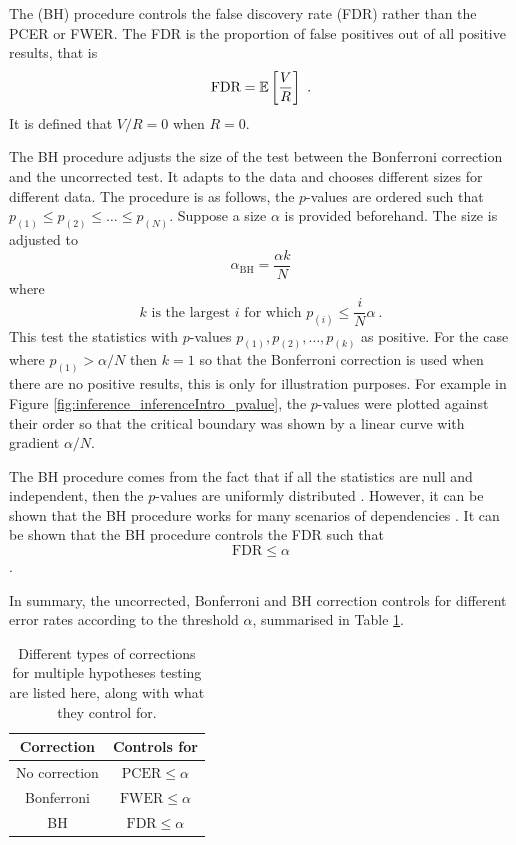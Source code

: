 The \cite{benjamini1995controlling} (BH) procedure controls the false discovery rate (FDR) \citep{benjamini2010discovering} rather than the PCER or FWER. The FDR is the proportion of false positives out of all positive results, that is
\begin{equation}
  \text{FDR} = \operatorname{\mathbb{E}}\left[\dfrac{V}{R}\right]
  \ .
\end{equation}
It is defined that $V/R=0$ when $R=0$.

The BH procedure adjusts the size of the test between the Bonferroni correction and the uncorrected test. It adapts to the data and chooses different sizes for different data. The procedure is as follows, the $p$-values are ordered such that $p_{(1)}\leqslant p_{(2)}\leqslant \dotsc \leqslant p_{(N)}$. Suppose a size $\alpha$ is provided beforehand. The size is adjusted to
\begin{equation}
  \alpha_{\text{BH}} = \frac{\alpha k}{N}
\end{equation}
where
\begin{equation}
  k\text{ is the largest }i\text{ for which }p_{(i)}\leqslant\frac{i}{N}\alpha
  \ .
\end{equation}
This test the statistics with $p$-values $p_{(1)},p_{(2)},\dotsc,p_{(k)}$ as positive. For the case where $p_{(1)}>\alpha/N$ then $k=1$ so that the Bonferroni correction is used when there are no positive results, this is only for illustration purposes. For example in Figure \ref{fig:inference_inferenceIntro_pvalue}, the $p$-values were plotted against their order so that the critical boundary was shown by a linear curve with gradient $\alpha/N$.

The BH procedure comes from the fact that if all the statistics are null and independent, then the $p$-values are uniformly distributed \citep{simes1986improved}. However, it can be shown that the BH procedure works for many scenarios of dependencies \citep{benjamini2001control}. It can be shown that the BH procedure controls the FDR such that
\begin{equation}
  \text{FDR}\leqslant\alpha
\end{equation}
\citep{benjamini1995controlling}.

In summary, the uncorrected, Bonferroni and BH correction controls for different error rates according to the threshold $\alpha$, summarised in Table \ref{table:inference_corrections}.

\begin{table}
    \centering
    \begin{tabular}{c|c}
        Correction&Controls for\\\hline
        No correction&$\text{PCER}\leqslant\alpha$\\
        Bonferroni&$\text{FWER}\leqslant\alpha$\\
        BH&$\text{FDR}\leqslant\alpha$
    \end{tabular}
    \caption{Different types of corrections for multiple hypotheses testing are listed here, along with what they control for.}
    \label{table:inference_corrections}
\end{table}

